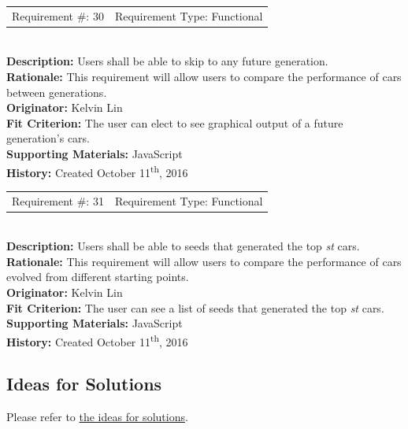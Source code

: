 \documentclass[12pt, titlepage]{article}
\begin{document}
\begin{reqbox}
%
\begin{tabular}{cc}
Requirement \#: 30 & Requirement Type: Functional \\
\end{tabular} \\
%
\textbf{Description:} Users shall be able to skip to any future generation.\\
\textbf{Rationale:}  This requirement will allow users to compare the 
performance of cars between generations.\\
\textbf{Originator:} Kelvin Lin\\
\textbf{Fit Criterion:} The user can elect to see graphical output of a future 
generation's cars.\\
%  
\textbf{Supporting Materials:} JavaScript \\
\textbf{History:} Created October 11\textsuperscript{th}, 2016
%
\end{reqbox}

\begin{reqbox}
%
\begin{tabular}{cc}
Requirement \#: 31 & Requirement Type: Functional \\
\end{tabular} \\
%
\textbf{Description:} Users shall be able to seeds that generated the top 
\textit{st} cars. \\
\textbf{Rationale:}  This requirement will allow users to compare the 
performance of cars evolved from different starting points.\\
\textbf{Originator:} Kelvin Lin\\
\textbf{Fit Criterion:} The user can see a list of seeds that generated the top 
\textit{st} cars.\\
%  
\textbf{Supporting Materials:} JavaScript \\
\textbf{History:} Created October 11\textsuperscript{th}, 2016
%
\end{reqbox}

\subsection{Ideas for Solutions}
Please refer to 
\href{https://gitlab.cas.mcmaster.ca/linkk4/GrateBox/tree/master/Doc/Wireframes}{the 
ideas for solutions}.




\end{document}
